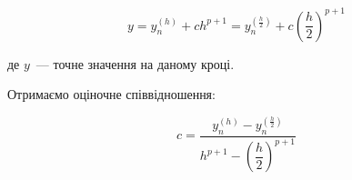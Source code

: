 \begin{equation}\label{eq:tochnoe}
  y = y_{n}^{(h)}+ch^{p+1} =
  y_{n}^{\left(\frac{h}{2}\right)}+
  c\left(\dfrac{h}{2}\right)^{p+1}
\end{equation}

де $y$~--- точне значення на даному кроці.

Отримаємо оціночне співвідношення:

\begin{equation}\label{eq:c}
  c=\frac{y_{n}^{(h)}-y_{n}^{\left(\frac{h}{2}\right)}}
        {h^{p+1}-\left(\dfrac{h}{2}\right)^{p+1}}
\end{equation}